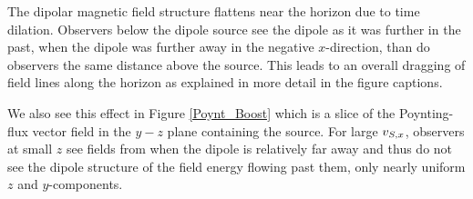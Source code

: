 The dipolar magnetic field structure
flattens near the horizon due to time dilation.
Observers below the dipole source 
 see the dipole as it was further in the past, when the dipole was
 further away in the negative $x$-direction, than do observers the same 
 distance above the source. 
This leads to an overall dragging of field lines along the horizon as explained
 in more detail in the figure captions.

 We also see this effect in Figure \ref{Poynt_Boost} which is a slice of the Poynting-flux vector field 
 in the $y-z$ plane containing the source. For large $v_{S, x}$, observers at small $z$ 
 see fields from when the dipole is relatively far away and thus do not see the 
 dipole structure of the field energy flowing past them, only nearly uniform $z$ and $y$-components.
 


